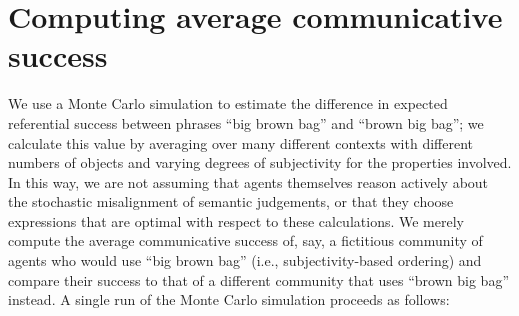 \documentclass[10pt,a4paper]{article}
\begin{document}
\section{Computing average communicative success}

We use a Monte Carlo simulation to estimate the difference in expected referential success between phrases ``big brown bag'' and ``brown big bag''; we calculate this value by averaging over many different contexts with different numbers of objects and varying degrees of subjectivity for the properties involved. In this way, we are not assuming that agents themselves reason actively about the stochastic misalignment of semantic judgements, or that they choose expressions that are optimal with respect to these calculations. We merely compute the average communicative success of, say, a fictitious community of agents who would use ``big brown bag'' (i.e., subjectivity-based ordering) and compare their success to that of a different community that uses ``brown big bag'' instead. A single run of the Monte Carlo simulation proceeds as follows:
\end{document}
